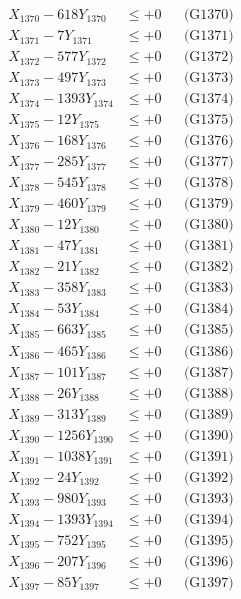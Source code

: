 \documentclass[a4paper,10pt]{article}
\begin{document}
{\begin{align}
X_{1370} - 618Y_{1370} &\leq +0 && \text{(G1370)} \\
\allowbreak
X_{1371} - 7Y_{1371} &\leq +0 && \text{(G1371)} \\
X_{1372} - 577Y_{1372} &\leq +0 && \text{(G1372)} \\
X_{1373} - 497Y_{1373} &\leq +0 && \text{(G1373)} \\
X_{1374} - 1393Y_{1374} &\leq +0 && \text{(G1374)} \\
X_{1375} - 12Y_{1375} &\leq +0 && \text{(G1375)} \\
X_{1376} - 168Y_{1376} &\leq +0 && \text{(G1376)} \\
X_{1377} - 285Y_{1377} &\leq +0 && \text{(G1377)} \\
X_{1378} - 545Y_{1378} &\leq +0 && \text{(G1378)} \\
X_{1379} - 460Y_{1379} &\leq +0 && \text{(G1379)} \\
X_{1380} - 12Y_{1380} &\leq +0 && \text{(G1380)} \\
\allowbreak
X_{1381} - 47Y_{1381} &\leq +0 && \text{(G1381)} \\
X_{1382} - 21Y_{1382} &\leq +0 && \text{(G1382)} \\
X_{1383} - 358Y_{1383} &\leq +0 && \text{(G1383)} \\
X_{1384} - 53Y_{1384} &\leq +0 && \text{(G1384)} \\
X_{1385} - 663Y_{1385} &\leq +0 && \text{(G1385)} \\
X_{1386} - 465Y_{1386} &\leq +0 && \text{(G1386)} \\
X_{1387} - 101Y_{1387} &\leq +0 && \text{(G1387)} \\
X_{1388} - 26Y_{1388} &\leq +0 && \text{(G1388)} \\
X_{1389} - 313Y_{1389} &\leq +0 && \text{(G1389)} \\
X_{1390} - 1256Y_{1390} &\leq +0 && \text{(G1390)} \\
\allowbreak
X_{1391} - 1038Y_{1391} &\leq +0 && \text{(G1391)} \\
X_{1392} - 24Y_{1392} &\leq +0 && \text{(G1392)} \\
X_{1393} - 980Y_{1393} &\leq +0 && \text{(G1393)} \\
X_{1394} - 1393Y_{1394} &\leq +0 && \text{(G1394)} \\
X_{1395} - 752Y_{1395} &\leq +0 && \text{(G1395)} \\
X_{1396} - 207Y_{1396} &\leq +0 && \text{(G1396)} \\
X_{1397} - 85Y_{1397} &\leq +0 && \text{(G1397)} \\

\end{align}}
\end{document}
